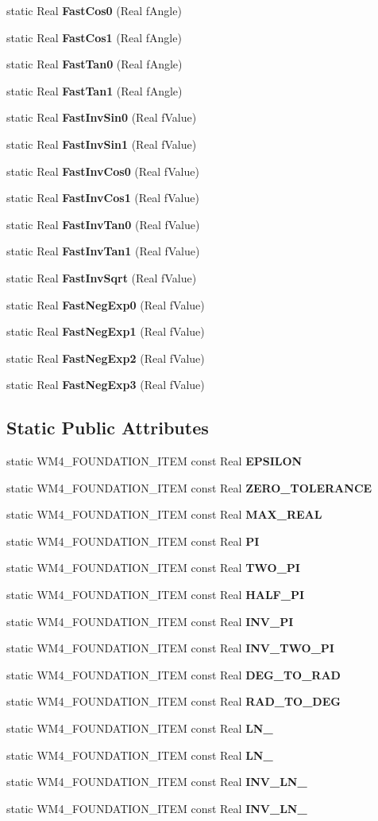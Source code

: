 \begin{CompactItemize}
\item 
static Real {\bf Fast\-Cos0} (Real f\-Angle)
\item 
static Real {\bf Fast\-Cos1} (Real f\-Angle)
\item 
static Real {\bf Fast\-Tan0} (Real f\-Angle)
\item 
static Real {\bf Fast\-Tan1} (Real f\-Angle)
\item 
static Real {\bf Fast\-Inv\-Sin0} (Real f\-Value)
\item 
static Real {\bf Fast\-Inv\-Sin1} (Real f\-Value)
\item 
static Real {\bf Fast\-Inv\-Cos0} (Real f\-Value)
\item 
static Real {\bf Fast\-Inv\-Cos1} (Real f\-Value)
\item 
static Real {\bf Fast\-Inv\-Tan0} (Real f\-Value)
\item 
static Real {\bf Fast\-Inv\-Tan1} (Real f\-Value)
\item 
static Real {\bf Fast\-Inv\-Sqrt} (Real f\-Value)
\item 
static Real {\bf Fast\-Neg\-Exp0} (Real f\-Value)
\item 
static Real {\bf Fast\-Neg\-Exp1} (Real f\-Value)
\item 
static Real {\bf Fast\-Neg\-Exp2} (Real f\-Value)
\item 
static Real {\bf Fast\-Neg\-Exp3} (Real f\-Value)
\end{CompactItemize}
\subsection*{Static Public Attributes}
\begin{CompactItemize}
\item 
static WM4\_\-FOUNDATION\_\-ITEM const Real {\bf EPSILON}
\item 
static WM4\_\-FOUNDATION\_\-ITEM const Real {\bf ZERO\_\-TOLERANCE}
\item 
static WM4\_\-FOUNDATION\_\-ITEM const Real {\bf MAX\_\-REAL}
\item 
static WM4\_\-FOUNDATION\_\-ITEM const Real {\bf PI}
\item 
static WM4\_\-FOUNDATION\_\-ITEM const Real {\bf TWO\_\-PI}
\item 
static WM4\_\-FOUNDATION\_\-ITEM const Real {\bf HALF\_\-PI}
\item 
static WM4\_\-FOUNDATION\_\-ITEM const Real {\bf INV\_\-PI}
\item 
static WM4\_\-FOUNDATION\_\-ITEM const Real {\bf INV\_\-TWO\_\-PI}
\item 
static WM4\_\-FOUNDATION\_\-ITEM const Real {\bf DEG\_\-TO\_\-RAD}
\item 
static WM4\_\-FOUNDATION\_\-ITEM const Real {\bf RAD\_\-TO\_\-DEG}
\item 
static WM4\_\-FOUNDATION\_\-ITEM const Real {\bf LN\_}
\item 
static WM4\_\-FOUNDATION\_\-ITEM const Real {\bf LN\_}
\item 
static WM4\_\-FOUNDATION\_\-ITEM const Real {\bf INV\_\-LN\_}
\item 
static WM4\_\-FOUNDATION\_\-ITEM const Real {\bf INV\_\-LN\_}
\end{CompactItemize}
